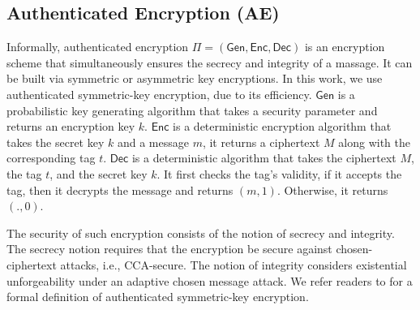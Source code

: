  
\subsection{Authenticated Encryption (AE)} 

Informally, authenticated encryption $\Pi=(\mathsf{Gen}, \mathsf{Enc}, \mathsf{Dec})$ is an encryption scheme that simultaneously ensures the secrecy and integrity of a massage. It can be built via symmetric or asymmetric key encryptions. In this work, we use authenticated symmetric-key encryption, due to its efficiency. $\mathsf{Gen}$ is a probabilistic key generating algorithm that takes a security parameter and returns an encryption key $k$. $\mathsf{Enc}$ is a deterministic encryption algorithm that takes the secret key $k$ and a message $m$, it returns a ciphertext $M$ along with the corresponding tag $t$. $\mathsf{Dec}$ is a deterministic algorithm that takes the ciphertext $M$, the tag $t$, and the secret key $k$. It first checks the tag's validity, if it accepts the tag, then it decrypts the message and returns $(m,1)$. Otherwise, it returns $(.,0)$. 


The security of such encryption consists of the notion of secrecy and integrity. The secrecy notion requires that the encryption be secure against chosen-ciphertext attacks, i.e., CCA-secure. The notion of integrity considers existential unforgeability under an adaptive chosen message attack. We refer readers to \cite{KatzLindell2014} for a formal definition of authenticated symmetric-key encryption. 




